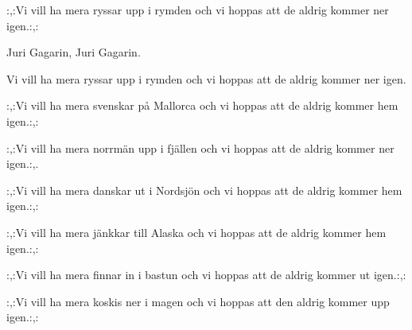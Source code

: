 


	
\beginverse*		%
:,:Vi vill ha mera ryssar upp i rymden
och vi hoppas att de aldrig kommer ner igen.:,:
\endverse			%

\beginchorus
Juri Gagarin,
Juri Gagarin.
\endchorus

\beginverse*		%
Vi vill ha mera ryssar upp i rymden
och vi hoppas att de aldrig
kommer ner igen.
\endverse			%

\beginverse*		%
:,:Vi vill ha mera svenskar på Mallorca
och vi hoppas att de aldrig kommer hem igen.:,:
\endverse			%

\beginverse*		%
:,:Vi vill ha mera norrmän upp i fjällen
och vi hoppas att de aldrig kommer ner igen.:,.
\endverse			%

\beginverse*		%
:,:Vi vill ha mera danskar ut i Nordsjön
och vi hoppas att de aldrig kommer hem igen.:,:
\endverse			%

\beginverse*		%
:,:Vi vill ha mera jänkkar till Alaska
och vi hoppas att de aldrig kommer hem igen.:,:
\endverse			%

\beginverse*		%
:,:Vi vill ha mera finnar in i bastun
och vi hoppas att de aldrig kommer ut igen.:,:
\endverse			%

\beginverse*		%
:,:Vi vill ha mera koskis ner i magen
och vi hoppas att den aldrig kommer upp igen.:,:
\endverse			%
\endsong			%
